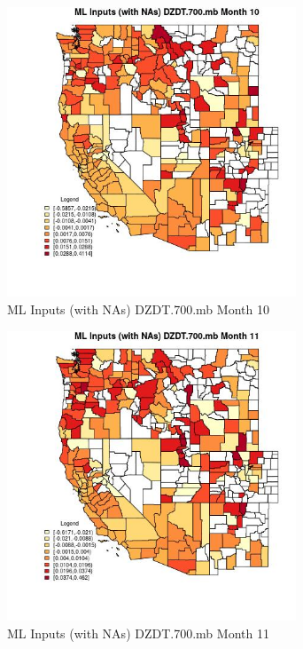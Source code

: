 \begin{figure} 
\centering  
\includegraphics[width=0.77\textwidth]{Code_Outputs/Report_ML_input_PM25_Step4_part_f_de_duplicated_aveswNAs_CountyDZDT700mbmedianMonth10.jpg} 
\caption{\label{fig:Report_ML_input_PM25_Step4_part_f_de_duplicated_aveswNAsCountyDZDT700mbmedianMonth10}ML Inputs (with NAs) DZDT.700.mb Month 10} 
\end{figure} 
 

\begin{figure} 
\centering  
\includegraphics[width=0.77\textwidth]{Code_Outputs/Report_ML_input_PM25_Step4_part_f_de_duplicated_aveswNAs_CountyDZDT700mbmedianMonth11.jpg} 
\caption{\label{fig:Report_ML_input_PM25_Step4_part_f_de_duplicated_aveswNAsCountyDZDT700mbmedianMonth11}ML Inputs (with NAs) DZDT.700.mb Month 11} 
\end{figure} 
 

